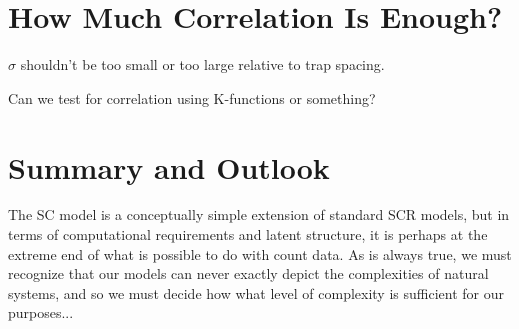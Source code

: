 \section{How Much Correlation Is Enough?}

$\sigma$ shouldn't be too small or too large relative to trap
spacing.

Can we test for correlation using K-functions or something?




\section{Summary and Outlook}

The SC model is a conceptually simple extension of standard SCR
models, but in terms of computational requirements and latent
structure, it is perhaps at the extreme end of what is possible to do
with count data. As is always true, we must recognize that
our models can never exactly depict the complexities of natural
systems, and so we must decide how what level of complexity is
sufficient for our purposes...

